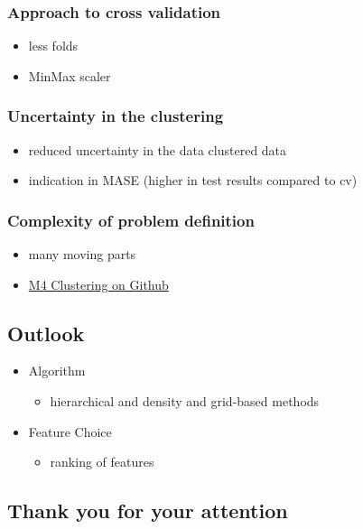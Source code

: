 \documentclass[11pt]{article}
\begin{document}
\subsubsection*{Approach to cross validation}
\label{sec:org2ab1d6d}
\begin{itemize}
\item less folds
\item MinMax scaler
\end{itemize}
\subsubsection*{Uncertainty in the clustering}
\label{sec:org97e2547}
\begin{itemize}
\item reduced uncertainty in the data clustered data
\item indication in MASE (higher in test results compared to cv)
\end{itemize}
\subsubsection*{Complexity of problem definition}
\label{sec:org5d9740c}
\begin{itemize}
\item many moving parts
\item \href{https://github.com/philippbeer/m4\_clustering}{M4 Clustering on Github}
\end{itemize}
\subsection*{Outlook}
\label{sec:orgd1d702f}
\begin{itemize}
\item Algorithm
\label{sec:org9231f1f}
\begin{itemize}
\item hierarchical and density and grid-based methods
\end{itemize}
\item Feature Choice
\label{sec:orgbe56351}
\begin{itemize}
\item ranking of features
\end{itemize}
\end{itemize}
\subsection*{Thank you for your attention}
\label{sec:orgba35993}
\end{document}
